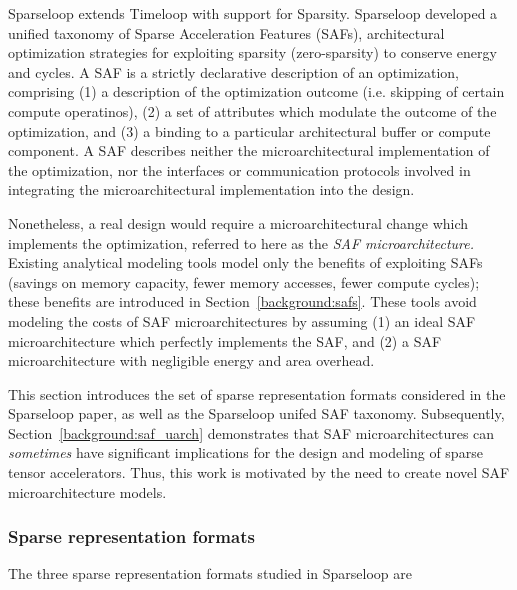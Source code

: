 Sparseloop\cite{sparseloop} extends Timeloop with support for Sparsity. Sparseloop developed a unified taxonomy of Sparse Acceleration Features (SAFs), architectural optimization strategies for exploiting sparsity (zero-sparsity) to conserve energy and cycles. A SAF is a strictly declarative description of an optimization, comprising (1) a description of the optimization outcome (i.e. skipping of certain compute operatinos), (2) a set of attributes which modulate the outcome of the optimization, and (3) a binding to a particular architectural buffer or compute component. A SAF describes neither the microarchitectural implementation of the optimization, nor the interfaces or communication protocols involved in integrating the microarchitectural implementation into the design. 

Nonetheless, a real design would require a microarchitectural change which implements the optimization, referred to here as the \textit{SAF microarchitecture.} Existing analytical modeling tools\cite{sparseloop} model only the benefits of exploiting SAFs (savings on memory capacity, fewer memory accesses, fewer compute cycles); these benefits are introduced in Section~\ref{background:safs}. These tools avoid modeling the costs of SAF microarchitectures by assuming (1) an ideal SAF microarchitecture which perfectly implements the SAF, and (2) a SAF microarchitecture with negligible energy and area overhead.

This section introduces the set of sparse representation formats considered in the Sparseloop paper, as well as the Sparseloop unifed SAF taxonomy. Subsequently, Section~\ref{background:saf_uarch} demonstrates that SAF microarchitectures can \textit{sometimes} have significant implications for the design and modeling of sparse tensor accelerators. Thus, this work is motivated by the need to create novel SAF microarchitecture models.

\subsubsection{Sparse representation formats}
\label{background:sparseloop_formats}

The three sparse representation formats studied in Sparseloop\cite{sparseloop} are

